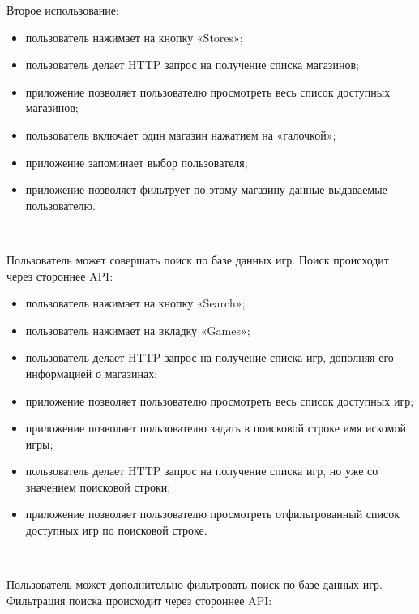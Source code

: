 Второе использование:

\begin{itemize}
  \item пользователь нажимает на кнопку «Stores»;
  \item пользователь делает HTTP запрос на получение списка магазинов;
  \item приложение позволяет пользователю просмотреть весь список доступных магазинов;
  \item пользователь включает один магазин нажатием на «галочкой»;
  \item приложение запоминает выбор пользователя;
  \item приложение позволяет фильтрует по этому магазину данные выдаваемые пользователю.
\end{itemize}

~\par

Пользователь может совершать поиск по базе данных игр. Поиск происходит через стороннее API:

\begin{itemize}
  \item пользователь нажимает на кнопку «Search»;
  \item пользователь нажимает на вкладку «Games»;
  \item пользователь делает HTTP запрос на получение списка игр, дополняя его информацией о магазинах;
  \item приложение позволяет пользователю просмотреть весь список доступных игр;
  \item приложение позволяет пользователю задать в поисковой строке имя искомой игры;
  \item пользователь делает HTTP запрос на получение списка игр, но уже со значением поисковой строки;
  \item приложение позволяет пользователю просмотреть отфильтрованный список доступных игр по поисковой строке.
\end{itemize}

~\par

Пользователь может дополнительно фильтровать поиск по базе данных игр. Фильтрация поиска происходит через стороннее API:



